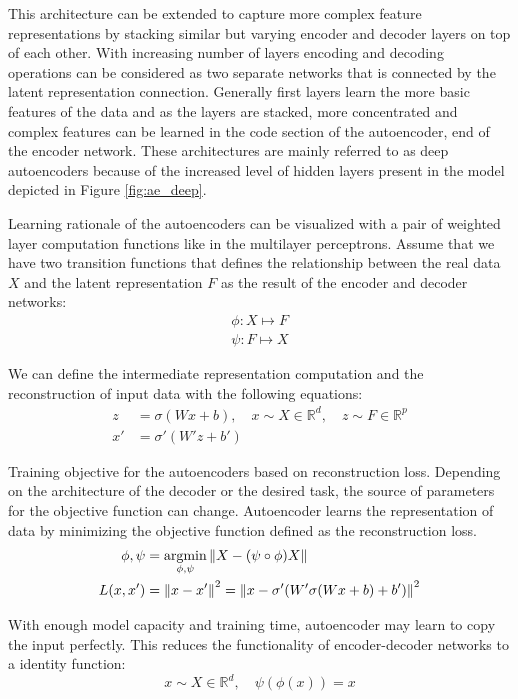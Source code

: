 {This architecture can be extended to capture more
complex feature representations by stacking similar but varying encoder and decoder layers on top of
each other. With increasing number of layers encoding and decoding operations can be considered as two separate 
networks that is connected by the latent representation connection. Generally first layers learn the more basic features 
of the data and as the layers are stacked, more concentrated and complex features can be learned in the code section 
of the autoencoder, end of the encoder network. These architectures are mainly referred to as deep
autoencoders because of the increased level of hidden layers present in the model depicted in Figure
\ref{fig:ae_deep}.

Learning rationale of the autoencoders can be visualized with a pair of weighted layer computation
functions like in the multilayer perceptrons. Assume that we have two transition functions that
defines the relationship between the real data $X$ and the latent representation $F$ as the result of
the encoder and decoder networks:
\begin{align*}
    \phi : X \mapsto F \\
    \psi : F \mapsto X     
\end{align*}

We can define the intermediate representation computation and the reconstruction of input data
with the following equations:
\begin{align}  
    z  &= \sigma( W x + b) ,\quad x \sim X \in \mathbb{R}^d ,\quad z \sim F \in \mathbb{R}^p \\
    x'  &= \sigma' (W' z + b') 
\end{align}

Training objective for the autoencoders based on reconstruction loss. Depending on the
architecture of the decoder or the desired task, the source of parameters for the objective
function can change. Autoencoder learns the representation of data by minimizing the objective function 
defined as the reconstruction loss. 
\begin{align}
    \label{eqn:ae_rec}
  \phi, \psi & = \underset{\phi, \psi}{\text{argmin}} \left\lVert X - (\psi \circ \phi) X\right\rVert \\  
  L(x, x') & = \left\lVert x - x'\right\rVert^2 = \left\lVert x - \sigma' (W' \sigma (W x + b) + b')\right\rVert^2
\end{align}

With enough model capacity and training time, autoencoder may learn to copy the input perfectly.
This reduces the functionality of encoder-decoder networks to a identity function:
$$
 x \sim X \in \mathbb{R}^d, \quad \psi(\phi(x)) = x
$$

}
